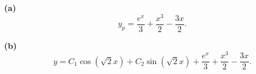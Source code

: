 \noindent\textbf{(a)} \[y_p=\frac{e^x}{3}+\frac{x^3}{2}-\frac{3x}{2}.\]

\noindent\textbf{(b)} \[y=C_1\cos(\sqrt2x)+C_2\sin(\sqrt2x)+\frac{e^x}{3}+\frac{x^3}{2}-\frac{3x}{2}.\]
